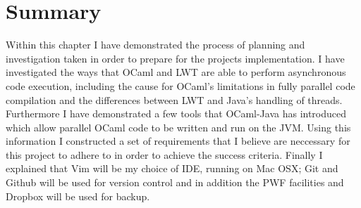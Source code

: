 \documentclass[12pt,twoside,notitlepage]{report}
\begin{document}
\section{Summary}
%
%
Within this chapter I have demonstrated the process of planning and investigation taken in order to prepare for the projects implementation. I have investigated the ways that OCaml and LWT are able to perform asynchronous code
execution, including the cause for OCaml's limitations in fully parallel code compilation and the differences between LWT and Java's handling of threads. Furthermore I have demonstrated a few tools that OCaml-Java has introduced which
allow parallel OCaml code to be written and run on the JVM. Using this information I constructed a set of requirements that I believe are neccessary for this project to adhere to in order to achieve the success criteria. Finally I
explained that Vim will be my choice of IDE, running on Mac OSX; Git and Github will be used for version control and in addition the PWF facilities and Dropbox will be used for backup.
\end{document}
